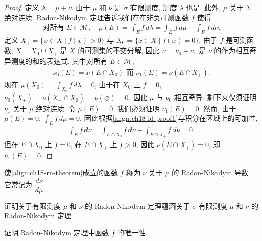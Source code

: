\documentclass[../../main.tex]{subfiles}
\begin{document}
\begin{proof}
定义 $\lambda=\mu+\nu$. 由于 $\mu$ 和 $\nu$ 是 $\sigma$ 有限测度, 测度 $\lambda$ 也是. 此外, $\mu$ 关于 $\lambda$ 绝对连续. Radon-Nikodym 定理告诉我们存在非负可测函数 $f$ 使得
\begin{align}
\text{对所有 }E\in\mathcal{M},\quad\mu(E)=\int_{E}f\,d\lambda=\int_{E}f\,d\mu+\int_{E}f\,d\nu.\label{align:ch18-ld-proof1}
\end{align}
定义 $X_{+}=\{x\in X\mid f(x)>0\}$ 与 $X_{0}=\{x\in X\mid f(x)=0\}$. 由于 $f$ 是可测函数, $X=X_{0}\cup X_{+}$ 是 $X$ 的可测集的不交分解, 因此 $\nu=\nu_{0}+\nu_{1}$ 是 $\nu$ 的作为相互奇异测度的和的表达式, 其中对所有 $E\in\mathcal{M}$,
\begin{align*}
\nu_{0}(E)=\nu(E\cap X_{0})\text{ 而 }\nu_{1}(E)=\nu(E\cap X_{+}).
\end{align*}
现在 $\mu(X_{0})=\int_{X_{0}}f\,d\lambda=0$, 由于在 $X_{0}$ 上 $f=0$, $\nu_{0}(X_{+})=\nu(X_{+}\cap X_{0})=\nu(\varnothing)=0$. 因此 $\mu$ 与 $\nu_{0}$ 相互奇异. 剩下来仅须证明 $\nu_{1}$ 关于 $\mu$ 绝对连续. 令 $\mu(E)=0$. 我们必须证明 $\nu_{1}(E)=0$. 然而, 由于 $\mu(E)=0$, $\int_{E}f\,d\mu=0$. 因此根据\eqref{align:ch18-ld-proof1}与积分在区域上的可加性,
\begin{align*}
\int_{E}f\,d\nu=\int_{E\cap X_{0}}f\,d\nu+\int_{E\cap X_{+}}f\,d\nu=0.
\end{align*}
但在 $E\cap X_{0}$ 上 $f=0$, 在 $E\cap X_{+}$ 上 $f>0$, 因此 $\nu(E\cap X_{+})=0$, 即 $\nu_{1}(E)=0$.
\end{proof}

使\eqref{align:ch18-rn-theorem}成立的函数 $f$ 称为 $\nu$ 关于 $\mu$ 的 Radon-Nikodym 导数. 它常记为 $\dfrac{d\nu}{d\mu}$.

\begin{exercise}\label{exercise:ch18-29}
证明关于有限测度 $\mu$ 和 $\nu$ 的 Radon-Nikodym 定理蕴涵关于 $\sigma$ 有限测度 $\mu$ 和 $\nu$ 的 Radon-Nikodym 定理.
\end{exercise}

\begin{exercise}\label{exercise:ch18-30}
证明 Radon-Nikodym 定理中函数 $f$ 的唯一性.
\end{exercise}
\end{document}
